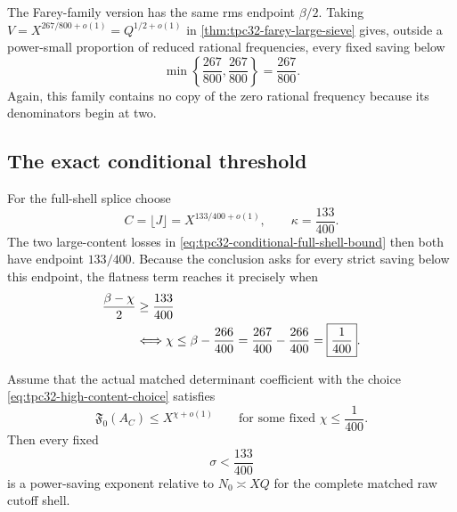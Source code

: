 The Farey-family version has the same rms endpoint $\beta/2$.  Taking
$V=X^{267/800+o(1)}=Q^{1/2+o(1)}$ in
\cref{thm:tpc32-farey-large-sieve} gives, outside a power-small
proportion of reduced rational frequencies, every fixed saving below
\begin{equation}
 \min\left\{\frac{267}{800},\frac{267}{800}\right\}
 =\frac{267}{800}.
 \label{eq:tpc32-high-farey-rms-endpoint}
\end{equation}
Again, this family contains no copy of the zero rational frequency
because its denominators begin at two.

\subsection{The exact conditional threshold}

For the full-shell splice choose
\begin{equation}
 C=\lfloor J\rfloor=X^{133/400+o(1)},
 \qquad
 \kappa=\frac{133}{400}.
 \label{eq:tpc32-high-content-choice}
\end{equation}
The two large-content losses in
\eqref{eq:tpc32-conditional-full-shell-bound} then both have endpoint
$133/400$.  Because the conclusion asks for every strict saving below this
endpoint, the flatness term reaches it precisely when
\begin{align}
 \frac{\beta-\chi}{2}
 &\ge\frac{133}{400}
 \notag\\
 &\Longleftrightarrow
 \chi\le\beta-\frac{266}{400}
 =\frac{267}{400}-\frac{266}{400}
 =\boxed{\frac1{400}}.
 \label{eq:tpc32-high-chi-threshold}
\end{align}

\begin{corollary}
\label{cor:tpc32-high-conditional-closure}
Assume that the actual matched determinant coefficient with the choice
\eqref{eq:tpc32-high-content-choice} satisfies
\begin{equation}
 \mathfrak F_0(A_C)\le X^{\chi+o(1)}
 \qquad\text{for some fixed }\chi\le\frac1{400}.
 \label{eq:tpc32-high-flatness-input}
\end{equation}
Then every fixed
\begin{equation}
 \boxed{\sigma<\frac{133}{400}}
 \label{eq:tpc32-high-conditional-saving}
\end{equation}
is a power-saving exponent relative to $N_0\asymp XQ$ for the complete
matched raw cutoff shell.
\end{corollary}

